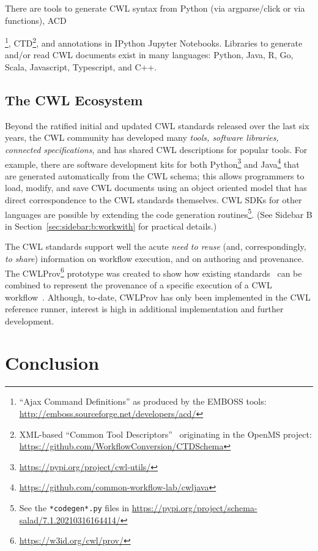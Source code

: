 {There are tools to generate CWL syntax from Python (via argparse/click or via functions), ACD{\footnote{``Ajax Command Definitions'' as produced by the EMBOSS tools: \url{http://emboss.sourceforge.net/developers/acd/}}, CTD\footnote{XML-based ``Common Tool Descriptors''~\cite{de_la_garza_desktop_2016} originating in the OpenMS project: \url{https://github.com/WorkflowConversion/CTDSchema}}, and annotations in IPython Jupyter Notebooks. Libraries to generate and/or read CWL documents exist in many languages: Python, Java, R, Go, Scala, Javascript, Typescript, and C++.

\subsection{The CWL Ecosystem}\label{sec:open:ecosystem}

Beyond the ratified initial and updated CWL standards released over the last six years, the CWL community has developed many \textit{tools, software libraries, connected specifications}, and has shared CWL descriptions for popular tools. For example, there are software development kits for both Python\footnote{\url{https://pypi.org/project/cwl-utils/}} and Java\footnote{\url{https://github.com/common-workflow-lab/cwljava}} that are generated automatically from the CWL schema; this allows programmers to load, modify, and save CWL documents using an object oriented model that has direct correspondence to the CWL standards themselves. CWL SDKs for other languages are possible by extending the code generation routines\footnote{See the \texttt{*codegen*.py} files in \url{https://pypi.org/project/schema-salad/7.1.20210316164414/}}. (See Sidebar B in Section~\ref{sec:sidebar:b:workwith} for practical details.)

The CWL standards support well the acute \textit{need to reuse} (and, correspondingly, \textit{to share}) information on workflow execution, and on authoring and provenance. The CWLProv\footnote{\url{https://w3id.org/cwl/prov/}} prototype was created to show how existing standards~\cite{belhajjame_using_2015,kunze_bagit_2018,Missier2013} can be combined to represent the provenance of a specific execution of a CWL workflow~\cite{khan-sharing-2019}. Although, to-date, CWLProv has only been implemented in the CWL reference runner, interest is high in additional implementation and further development.

\section{Conclusion}\label{sec:conclusion}

}}
